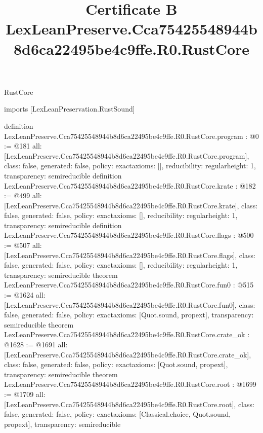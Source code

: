 \begin{lexlean}{RustCore}
\title{Certificate B LexLeanPreserve.Cca75425548944b8d6ca22495be4c9ffe.R0.RustCore}
\begin{coremodule}
imports [LexLeanPreservation.RustSound]

definition LexLeanPreserve.Cca75425548944b8d6ca22495be4c9ffe.R0.RustCore.program : @0 := @181 {
  all: [LexLeanPreserve.Cca75425548944b8d6ca22495be4c9ffe.R0.RustCore.program],
  class: false,
  generated: false,
  policy: exact{axioms: []},
  reducibility: regular{height: 1},
  transparency: semireducible
}
definition LexLeanPreserve.Cca75425548944b8d6ca22495be4c9ffe.R0.RustCore.krate : @182 := @499 {
  all: [LexLeanPreserve.Cca75425548944b8d6ca22495be4c9ffe.R0.RustCore.krate],
  class: false,
  generated: false,
  policy: exact{axioms: []},
  reducibility: regular{height: 1},
  transparency: semireducible
}
definition LexLeanPreserve.Cca75425548944b8d6ca22495be4c9ffe.R0.RustCore.flags : @500 := @507 {
  all: [LexLeanPreserve.Cca75425548944b8d6ca22495be4c9ffe.R0.RustCore.flags],
  class: false,
  generated: false,
  policy: exact{axioms: []},
  reducibility: regular{height: 1},
  transparency: semireducible
}
theorem LexLeanPreserve.Cca75425548944b8d6ca22495be4c9ffe.R0.RustCore.fun0 : @515 := @1624 {
  all: [LexLeanPreserve.Cca75425548944b8d6ca22495be4c9ffe.R0.RustCore.fun0],
  class: false,
  generated: false,
  policy: exact{axioms: [Quot.sound, propext]},
  transparency: semireducible
}
theorem LexLeanPreserve.Cca75425548944b8d6ca22495be4c9ffe.R0.RustCore.crate_ok : @1628 := @1691 {
  all: [LexLeanPreserve.Cca75425548944b8d6ca22495be4c9ffe.R0.RustCore.crate_ok],
  class: false,
  generated: false,
  policy: exact{axioms: [Quot.sound, propext]},
  transparency: semireducible
}
theorem LexLeanPreserve.Cca75425548944b8d6ca22495be4c9ffe.R0.RustCore.root : @1699 := @1709 {
  all: [LexLeanPreserve.Cca75425548944b8d6ca22495be4c9ffe.R0.RustCore.root],
  class: false,
  generated: false,
  policy: exact{axioms: [Classical.choice, Quot.sound, propext]},
  transparency: semireducible
}


\end{coremodule}
\end{lexlean}
